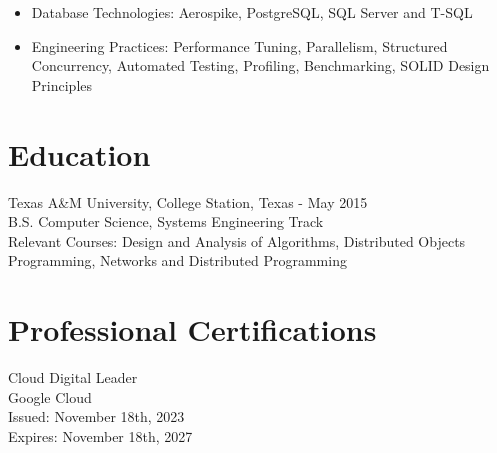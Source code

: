 \documentclass[11pt]{res}
\begin{document}
\begin{resume}
\begin{itemize}
\item Database Technologies: Aerospike, PostgreSQL, SQL Server and T-SQL

\item Engineering Practices: Performance Tuning, Parallelism, Structured Concurrency, Automated Testing, Profiling, Benchmarking, SOLID Design Principles

\end{itemize}

\section{Education}

\noindent Texas A\&M University, College Station, Texas - May 2015 \\
B.S. Computer Science, Systems Engineering Track \\
Relevant Courses: Design and Analysis of Algorithms, Distributed Objects Programming, Networks and Distributed Programming

\section{Professional Certifications}

\noindent Cloud Digital Leader \\
Google Cloud \\
Issued: November 18th, 2023 \\
Expires: November 18th, 2027

\end{resume}
\end{document}

